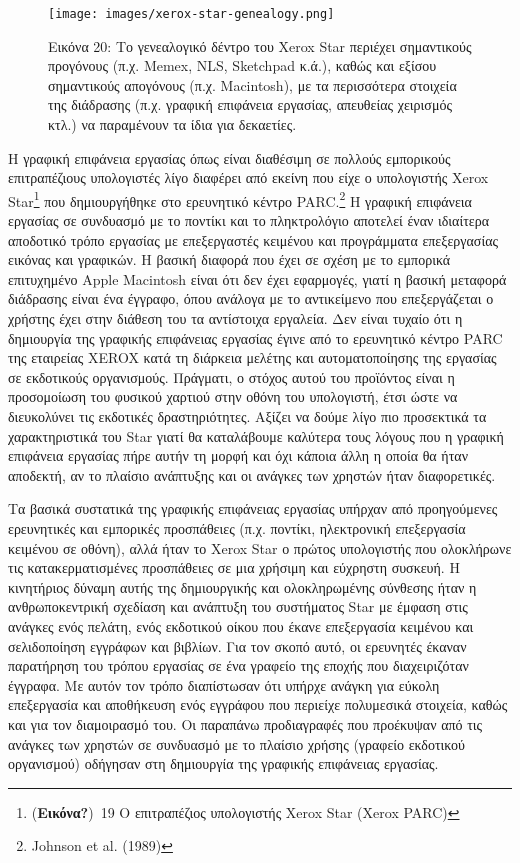 \documentclass[
]{article}
\begin{document}
\leavevmode{}%
\begin{figure}
\hypertarget{fig:xerox-star-genealogy}{%
\centering
\texttt{[image: images/xerox-star-genealogy.png]}
\caption{Εικόνα 20: Το γενεαλογικό δέντρο του Xerox Star περιέχει
σημαντικούς προγόνους (π.χ. Memex, NLS, Sketchpad κ.ά.), καθώς και
εξίσου σημαντικούς απογόνους (π.χ. Macintosh), με τα περισσότερα
στοιχεία της διάδρασης (π.χ. γραφική επιφάνεια εργασίας, απευθείας
χειρισμός κτλ.) να παραμένουν τα ίδια για
δεκαετίες.}\label{fig:xerox-star-genealogy}
}
\end{figure}

Η γραφική επιφάνεια εργασίας όπως είναι διαθέσιμη σε πολλούς εμπορικούς
επιτραπέζιους υπολογιστές λίγο διαφέρει από εκείνη που είχε ο
υπολογιστής Xerox Star\footnote{(\textbf{Εικόνα?})~19 Ο επιτραπέζιος
  υπολογιστής Xerox Star (Xerox PARC)} που δημιουργήθηκε στο ερευνητικό
κέντρο PARC.\footnote{Johnson et al. (1989)} Η γραφική επιφάνεια
εργασίας σε συνδυασμό με το ποντίκι και το πληκτρολόγιο αποτελεί έναν
ιδιαίτερα αποδοτικό τρόπο εργασίας με επεξεργαστές κειμένου και
προγράμματα επεξεργασίας εικόνας και γραφικών. Η βασική διαφορά που έχει
σε σχέση με το εμπορικά επιτυχημένο Apple Macintosh είναι ότι δεν έχει
εφαρμογές, γιατί η βασική μεταφορά διάδρασης είναι ένα έγγραφο, όπου
ανάλογα με το αντικείμενο που επεξεργάζεται ο χρήστης έχει στην διάθεση
του τα αντίστοιχα εργαλεία. Δεν είναι τυχαίο ότι η δημιουργία της
γραφικής επιφάνειας εργασίας έγινε από το ερευνητικό κέντρο PARC της
εταιρείας XEROX κατά τη διάρκεια μελέτης και αυτοματοποίησης της
εργασίας σε εκδοτικούς οργανισμούς. Πράγματι, ο στόχος αυτού του
προϊόντος είναι η προσομοίωση του φυσικού χαρτιού στην οθόνη του
υπολογιστή, έτσι ώστε να διευκολύνει τις εκδοτικές δραστηριότητες.
Αξίζει να δούμε λίγο πιο προσεκτικά τα χαρακτηριστικά του Star γιατί θα
καταλάβουμε καλύτερα τους λόγους που η γραφική επιφάνεια εργασίας πήρε
αυτήν τη μορφή και όχι κάποια άλλη η οποία θα ήταν αποδεκτή, αν το
πλαίσιο ανάπτυξης και οι ανάγκες των χρηστών ήταν διαφορετικές.

Τα βασικά συστατικά της γραφικής επιφάνειας εργασίας υπήρχαν από
προηγούμενες ερευνητικές και εμπορικές προσπάθειες (π.χ. ποντίκι,
ηλεκτρονική επεξεργασία κειμένου σε οθόνη), αλλά ήταν το Xerox Star ο
πρώτος υπολογιστής που ολοκλήρωνε τις κατακερματισμένες προσπάθειες σε
μια χρήσιμη και εύχρηστη συσκευή. Η κινητήριος δύναμη αυτής της
δημιουργικής και ολοκληρωμένης σύνθεσης ήταν η ανθρωποκεντρική σχεδίαση
και ανάπτυξη του συστήματος Star με έμφαση στις ανάγκες ενός πελάτη,
ενός εκδοτικού οίκου που έκανε επεξεργασία κειμένου και σελιδοποίηση
εγγράφων και βιβλίων. Για τον σκοπό αυτό, οι ερευνητές έκαναν παρατήρηση
του τρόπου εργασίας σε ένα γραφείο της εποχής που διαχειριζόταν έγγραφα.
Με αυτόν τον τρόπο διαπίστωσαν ότι υπήρχε ανάγκη για εύκολη επεξεργασία
και αποθήκευση ενός εγγράφου που περιείχε πολυμεσικά στοιχεία, καθώς και
για τον διαμοιρασμό του. Οι παραπάνω προδιαγραφές που προέκυψαν από τις
ανάγκες των χρηστών σε συνδυασμό με το πλαίσιο χρήσης (γραφείο εκδοτικού
οργανισμού) οδήγησαν στη δημιουργία της γραφικής επιφάνειας εργασίας.
\end{document}
